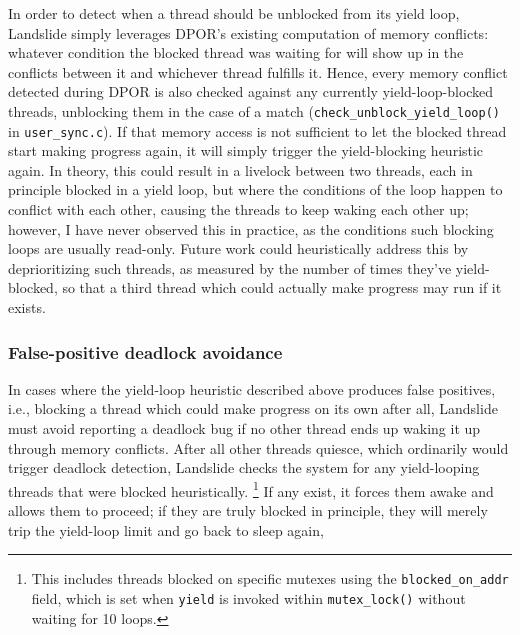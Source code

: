 In order to detect when a thread should be unblocked from its yield loop,
Landslide simply leverages DPOR's existing computation of memory conflicts:
whatever condition the blocked thread was waiting for
will show up in the conflicts between it and whichever thread fulfills it.
Hence, every memory conflict detected during DPOR is also checked against any
currently yield-loop-blocked threads, unblocking them in the case of a match
({\tt check\_unblock\_yield\_loop()} in {\tt user\_sync.c}).
If that memory access is not sufficient to let the blocked thread start making progress again,
it will simply trigger the yield-blocking heuristic again.
In theory, this could result in a livelock between two threads,
each in principle blocked in a yield loop,
but where the conditions of the loop happen to conflict with each other,
causing the threads to keep waking each other up;
however,
I have never observed this in practice, as the conditions  such blocking loops are usually read-only.
Future work could heuristically address this by deprioritizing such threads,
as measured by the number of times they've yield-blocked,
so that a third thread which could actually make progress may run if it exists.


\subsubsection{False-positive deadlock avoidance}
\label{sec:landslide-fp-deadlock}

In cases where the yield-loop heuristic described above produces false positives,
i.e., blocking a thread which could make progress on its own after all,
Landslide must avoid reporting a deadlock bug if no other thread ends up waking it up through memory conflicts.
After all other threads quiesce,
which ordinarily would trigger deadlock detection,
Landslide checks the system for any yield-looping threads that were blocked heuristically.%
\footnote{This includes threads blocked on specific mutexes using the {\tt blocked\_on\_addr} field,
which is set when {\tt yield} is invoked within {\tt mutex\_lock()} without waiting for 10 loops.}
If any exist, it forces them awake and allows them to proceed;
if they are truly blocked in principle,
they will merely trip the yield-loop limit and go back to sleep again,

